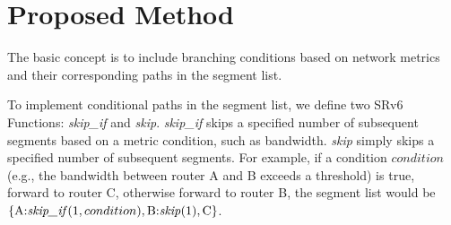 \documentclass[conference]{IEEEtran}
\begin{document}


\section{Proposed Method}

The basic concept is to include branching conditions based on network metrics and their corresponding paths in the segment list.

To implement conditional paths in the segment list, we define two SRv6 Functions: \textit{skip\_if} and \textit{skip}.
\textit{skip\_if} skips a specified number of subsequent segments based on a metric condition, such as bandwidth.
\textit{skip} simply skips a specified number of subsequent segments.
For example, if a condition $condition$ (e.g., the bandwidth between router A and B exceeds a threshold) is true, forward to router C, otherwise forward to router B, the segment list would be $\{ \text{A:\textit{skip\_if}}(1, condition), \text{B:\textit{skip}}(1), \text{C} \}$.

\end{document}
